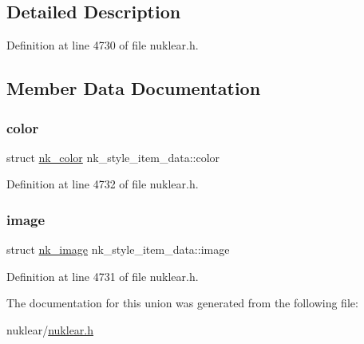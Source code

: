 \subsection{Detailed Description}


Definition at line 4730 of file nuklear.\+h.



\subsection{Member Data Documentation}
\mbox{\label{unionnk__style__item__data_ab7eee146e91f259891435c8c89792938}} 
\subsubsection{\texorpdfstring{color}{color}}
{\footnotesize\ttfamily struct \mbox{\hyperlink{structnk__color}{nk\+\_\+color}} nk\+\_\+style\+\_\+item\+\_\+data\+::color}



Definition at line 4732 of file nuklear.\+h.

\mbox{\label{unionnk__style__item__data_ae0256c98c4e25f3b8ad0596d6dd68407}} 
\subsubsection{\texorpdfstring{image}{image}}
{\footnotesize\ttfamily struct \mbox{\hyperlink{structnk__image}{nk\+\_\+image}} nk\+\_\+style\+\_\+item\+\_\+data\+::image}



Definition at line 4731 of file nuklear.\+h.



The documentation for this union was generated from the following file\+:\begin{DoxyCompactItemize}
\item 
nuklear/\mbox{\hyperlink{nuklear_8h}{nuklear.\+h}}\end{DoxyCompactItemize}
